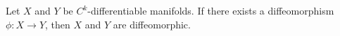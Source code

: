 Let $X$ and $Y$ be $C^k$-differentiable manifolds. If there exists a diffeomorphism $\phi: X \to Y$, then $X$ and $Y$ are diffeomorphic.
